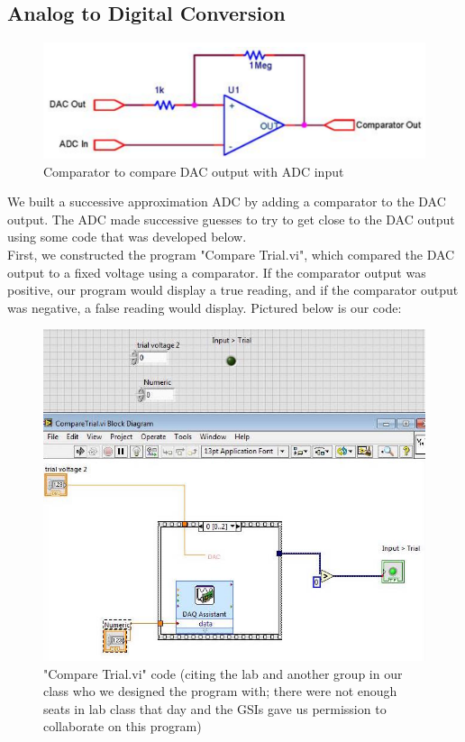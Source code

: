 \documentclass{article}
\begin{document}
\subsection{Analog to Digital Conversion}
    \begin{figure}[H]
        \centering
        \includegraphics[scale = 0.5]{4a.png}
        \caption{Comparator to compare DAC output with ADC input \cite{lab10}}
        \label{fig:my_label}
    \end{figure}
    We built a successive approximation ADC by adding a comparator to the DAC output. The ADC made successive guesses to try to get close to the DAC output using some code that was developed below.\\\indent First, we constructed the program "Compare Trial.vi", which compared the DAC output to a fixed voltage using a comparator. If the comparator output was positive, our program would display a true reading, and if the comparator output was negative, a false reading would display. Pictured below is our code:
    \begin{figure}[H]
        \centering
        \includegraphics[scale = 0.5]{4b.jpeg}
        \caption{"Compare Trial.vi" code \cite{lab10}(citing the lab and another group in our class who we designed the program with; there were not enough seats in lab class that day and the GSIs gave us permission to collaborate on this program)}
        \label{fig:my_label}
    \end{figure}
\end{document}

